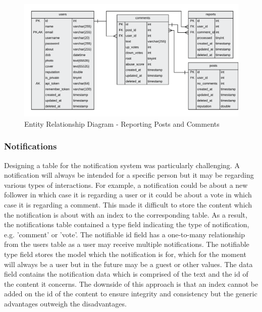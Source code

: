 \begin{figure}[H]
  \centering
  \includegraphics[width=1.0\textwidth]{Images/Design/Database/Reports}
  \caption{Entity Relationship Diagram - Reporting Posts and Comments} \label{fig:ERD_Reporting}
\end{figure}

\subsubsection{Notifications}
Designing a table for the notification system was particularly challenging. A notification will always be intended for a specific person but it may be regarding various types of interactions. For example, a notification could be about a new follower in which case it is regarding a user or it could be about a vote in which case it is regarding a comment. This made it difficult to store the content which the notification is about with an index to the corresponding table. As a result, the notifications table contained a type field indicating the type of notification, e.g. 'comment' or 'vote'. The notifiable id field has a one-to-many relationship from the users table as a user may receive multiple notifications. The notifiable type field stores the model which the notification is for, which for the moment will always be a user but in the future may be a guest or other values. The data field contains the notification data which is comprised of the text and the id of the content it concerns. The downside of this approach is that an index cannot be added on the id of the content to ensure integrity and consistency but the generic advantages outweigh the disadvantages.

